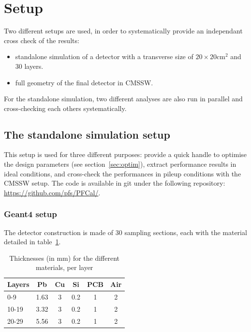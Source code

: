 \section{Setup}
\label{sec:setup}

Two different setups are used, in order to systematically provide an
independant cross check of the results:
\begin{itemize}
\item standalone simulation of a detector with a transverse size of $20 \times 20$cm$^2$ and 30 layers.
\item full geometry of the final detector in CMSSW.
\end{itemize}

For the standalone simulation, two different analyses are also run in
parallel and cross-checking each others systematically.

\subsection{The standalone simulation setup}
\label{sec:standalone}

This setup is used for three different purposes: provide a quick
handle to optimise the design parameters (see
section~\ref{sec:optim}), extract performance results in ideal
conditions, and cross-check the performances in pileup conditions with
the CMSSW setup. The code is available in git under the following
repository: \url{https://github.com/pfs/PFCal/}.

\subsubsection{Geant4 setup}

The detector construction is made of 30 sampling sections, each with
the material detailed in table~\ref{tab:samplSec}.

\begin{table}[h!]
 \begin{center}
\caption{\label{tab:samplSec} Thicknesses (in mm) for the different materials, per layer}
\begin{tabular}{|l|c|c|c|c|c|}
\hline
Layers & Pb & Cu & Si & PCB & Air \\
\hline
0-9  & 1.63 & 3 & 0.2 & 1 & 2 \\
10-19 & 3.32 & 3 & 0.2 & 1 & 2 \\
20-29 & 5.56 & 3 & 0.2 & 1 & 2 \\
\hline
\end{tabular}
\end{center}
\end{table}


